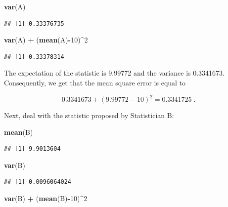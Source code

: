 \documentclass[]{krantz}
\makeatletter
\newenvironment{Shaded}{\begin{snugshade}}{\end{snugshade}}
\newcommand{\KeywordTok}[1]{\textcolor[rgb]{0.13,0.29,0.53}{\textbf{#1}}}
\newcommand{\DecValTok}[1]{\textcolor[rgb]{0.00,0.00,0.81}{#1}}
\newcommand{\StringTok}[1]{\textcolor[rgb]{0.31,0.60,0.02}{#1}}
\newcommand{\OperatorTok}[1]{\textcolor[rgb]{0.81,0.36,0.00}{\textbf{#1}}}
\newcommand{\NormalTok}[1]{#1}
\newenvironment{kframe}{%
\medskip{}
\setlength{\fboxsep}{.8em}
 \def\at@end@of@kframe{}%
 \ifinner\ifhmode%
  \def\at@end@of@kframe{\end{minipage}}%
  \begin{minipage}{\columnwidth}%
 \fi\fi%
 \def\FrameCommand##1{\hskip\@totalleftmargin \hskip-\fboxsep
 \colorbox{shadecolor}{##1}\hskip-\fboxsep
     \hskip-\linewidth \hskip-\@totalleftmargin \hskip\columnwidth}%
 \MakeFramed {\advance\hsize-\width
   \@totalleftmargin\z@ \linewidth\hsize
   \@setminipage}}%
 {\par\unskip\endMakeFramed%
 \at@end@of@kframe}
\renewenvironment{Shaded}{\begin{kframe}}{\end{kframe}}
\theoremstyle{definition}
\theoremstyle{definition}
\theoremstyle{definition}
\theoremstyle{remark}
\makeatother
\begin{document}
\begin{Shaded}
\begin{Highlighting}[]
\KeywordTok{var}\NormalTok{(A)}
\end{Highlighting}
\end{Shaded}

\begin{verbatim}
## [1] 0.33376735
\end{verbatim}

\begin{Shaded}
\begin{Highlighting}[]
\KeywordTok{var}\NormalTok{(A) }\OperatorTok{+}\StringTok{ }\NormalTok{(}\KeywordTok{mean}\NormalTok{(A)}\OperatorTok{-}\DecValTok{10}\NormalTok{)}\OperatorTok{^}\DecValTok{2}
\end{Highlighting}
\end{Shaded}

\begin{verbatim}
## [1] 0.33378314
\end{verbatim}

The expectation of the statistic is 9.99772 and the variance is
0.3341673. Consequently, we get that the mean square error is equal to

\[0.3341673 + (9.99772 - 10)^2 = 0.3341725\;.\]

Next, deal with the statistic proposed by Statistician B:

\begin{Shaded}
\begin{Highlighting}[]
\KeywordTok{mean}\NormalTok{(B)}
\end{Highlighting}
\end{Shaded}

\begin{verbatim}
## [1] 9.9013604
\end{verbatim}

\begin{Shaded}
\begin{Highlighting}[]
\KeywordTok{var}\NormalTok{(B)}
\end{Highlighting}
\end{Shaded}

\begin{verbatim}
## [1] 0.0096064024
\end{verbatim}

\begin{Shaded}
\begin{Highlighting}[]
\KeywordTok{var}\NormalTok{(B) }\OperatorTok{+}\StringTok{ }\NormalTok{(}\KeywordTok{mean}\NormalTok{(B)}\OperatorTok{-}\DecValTok{10}\NormalTok{)}\OperatorTok{^}\DecValTok{2}
\end{Highlighting}
\end{Shaded}
\end{document}
